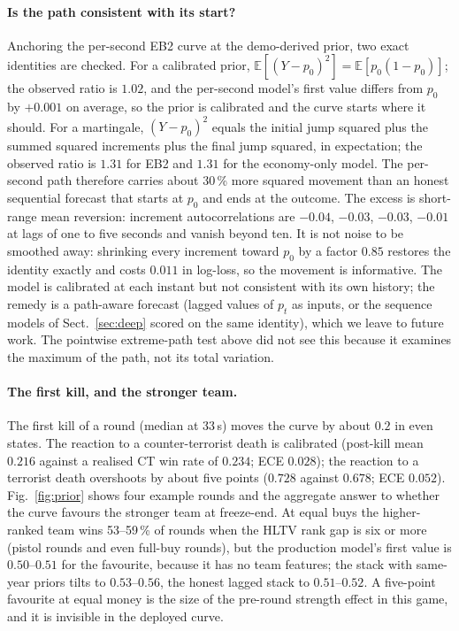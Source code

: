 \documentclass[11pt,a4paper]{article}
\begin{document}
\paragraph{Is the path consistent with its start?}
Anchoring the per-second EB2 curve at the demo-derived prior, two exact identities are checked. For a
calibrated prior, $\mathbb{E}[(Y - p_0)^2] = \mathbb{E}[p_0(1-p_0)]$; the observed ratio is $1.02$, and the
per-second model's first value differs from $p_0$ by $+0.001$ on average, so the prior is calibrated and
the curve starts where it should. For a martingale, $(Y - p_0)^2$ equals the initial jump squared plus
the summed squared increments plus the final jump squared, in expectation; the observed ratio is
$1.31$ for EB2 and $1.31$ for the economy-only model. The per-second path therefore carries about
30\,\% more squared movement than an honest sequential forecast that starts at $p_0$ and ends at the
outcome. The excess is short-range mean reversion: increment autocorrelations are $-0.04$, $-0.03$,
$-0.03$, $-0.01$ at lags of one to five seconds and vanish beyond ten. It is not noise to be smoothed
away: shrinking every increment toward $p_0$ by a factor $0.85$ restores the identity exactly and costs
$0.011$ in log-loss, so the movement is informative. The model is calibrated at each instant but not
consistent with its own history; the remedy is a path-aware forecast (lagged values of $p_t$ as inputs,
or the sequence models of Sect.~\ref{sec:deep} scored on the same identity), which we leave to future
work. The pointwise extreme-path test above did not see this because it examines the maximum of the
path, not its total variation.

\paragraph{The first kill, and the stronger team.}
The first kill of a round (median at 33\,s) moves the curve by about $0.2$ in even states. The reaction
to a counter-terrorist death is calibrated (post-kill mean $0.216$ against a realised CT win rate of
$0.234$; ECE $0.028$); the reaction to a terrorist death overshoots by about five points ($0.728$
against $0.678$; ECE $0.052$). Fig.~\ref{fig:prior} shows four example rounds and the aggregate answer
to whether the curve favours the stronger team at freeze-end. At equal buys the higher-ranked team wins
53--59\,\% of rounds when the HLTV rank gap is six or more (pistol rounds and even full-buy rounds),
but the production model's first value is $0.50$--$0.51$ for the favourite, because it has no team
features; the stack with same-year priors tilts to $0.53$--$0.56$, the honest lagged stack to
$0.51$--$0.52$. A five-point favourite at equal money is the size of the pre-round strength effect in
this game, and it is invisible in the deployed curve.
\end{document}

